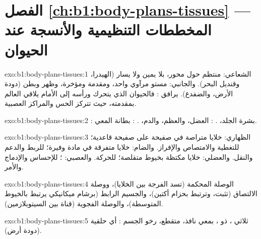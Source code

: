 \section*{الفصل \ref{ch:b1:body-plans-tissues} --- المخططات التنظيمية والأنسجة عند الحيوان}

\begin{solution}{exo:b1:body-plans-tissues:1}
الشعاعي: منتظم حول محور، بلا يمين ولا يسار (الهيدرا، وقنديل البحر).
والجانبي: مستو مرآوي واحد، ومقدمة ومؤخرة، وظهر وبطن (دودة الأرض،
والضفدع).  يرافق : فالحيوان الذي يتحرك
ورأسه إلى الأمام يلاقي العالم بمقدمته، حيث تتركز  الحس والمراكز
العصبية.
\end{solution}

\begin{solution}{exo:b1:body-plans-tissues:2}
: بشرة الجلد، . : العضل،
والعظم، والدم، . : بطانة المعي.
\end{solution}

\begin{solution}{exo:b1:body-plans-tissues:3}
الظهاري: خلايا  متراصة في صفيحة على صفيحة قاعدية؛ للتغطية
والامتصاص والإفراز. والضام: خلايا متفرقة في مادة وفيرة؛ للربط
والدعم والنقل. والعضلي: خلايا مكتظة بخيوط متقلصة؛ للحركة. والعصبي:
 ؛ للإحساس والإدماج والأمر.
\end{solution}

\begin{solution}{exo:b1:body-plans-tissues:4}
الوصلة المحكمة (تسد الفرجة بين الخلايا)، ووصلة الالتصاق (تثبت،
وترتبط بحزام أكتين)، والجسيم الرابط (برشام ميكانيكي يرتبط بالخيوط
المتوسطة)، والوصلة الفجوية (قناة بين السيتوبلازمين).
\end{solution}

\begin{solution}{exo:b1:body-plans-tissues:5}
ثلاثي ، ذو ، بمعي نافذ، متقطع، رخو الجسم :
أي حلقية (دودة أرض).
\end{solution}

